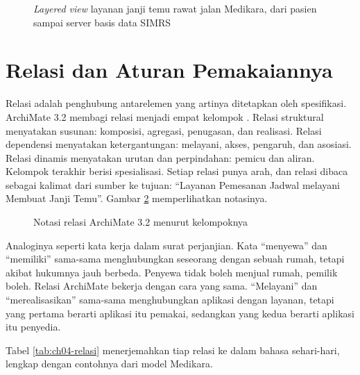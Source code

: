 \begin{figure}[!htb]
  \centering
  
  \caption{\textit{Layered view} layanan janji temu rawat jalan Medikara, dari
           pasien sampai server basis data SIMRS}
  \label{fig:ch04-layered-janji-temu}
\end{figure}

\section{Relasi dan Aturan Pemakaiannya}

Relasi adalah penghubung antarelemen yang artinya ditetapkan oleh
spesifikasi. ArchiMate 3.2 membagi relasi menjadi empat kelompok
\cite{archimate32}. Relasi struktural menyatakan susunan: komposisi,
agregasi, penugasan, dan realisasi. Relasi dependensi menyatakan
ketergantungan: melayani, akses, pengaruh, dan asosiasi. Relasi dinamis
menyatakan urutan dan perpindahan: pemicu dan aliran. Kelompok terakhir
berisi spesialisasi. Setiap relasi punya arah, dan relasi dibaca sebagai
kalimat dari sumber ke tujuan: ``Layanan Pemesanan Jadwal melayani Membuat
Janji Temu''. Gambar \ref{fig:ch04-notasi-relasi} memperlihatkan notasinya.

\begin{figure}[!htb]
  \centering
  
  \caption{Notasi relasi ArchiMate 3.2 menurut kelompoknya}
  \label{fig:ch04-notasi-relasi}
\end{figure}

Analoginya seperti kata kerja dalam surat perjanjian. Kata ``menyewa'' dan
``memiliki'' sama-sama menghubungkan seseorang dengan sebuah rumah, tetapi
akibat hukumnya jauh berbeda. Penyewa tidak boleh menjual rumah, pemilik
boleh. Relasi ArchiMate bekerja dengan cara yang sama. ``Melayani'' dan
``merealisasikan'' sama-sama menghubungkan aplikasi dengan layanan, tetapi
yang pertama berarti aplikasi itu pemakai, sedangkan yang kedua berarti
aplikasi itu penyedia.

Tabel \ref{tab:ch04-relasi} menerjemahkan tiap relasi ke dalam bahasa
sehari-hari, lengkap dengan contohnya dari model Medikara.

